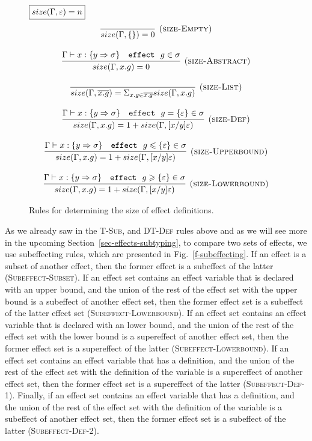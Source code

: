 \begin{figure}[t]
\flushleft
\footnotesize{
\noindent$\fbox{$size(\Gamma, \varepsilon) = n$}$
\[
\begin{array}{c}
\infer[\textsc{(size-Empty)}]
    {size(\Gamma, \{\}) = 0}
    {}\\[3ex]
\infer[\textsc{(size-Abstract)}]
    {size(\Gamma, x.g) = 0}
    {\Gamma \vdash x: \{y\Rightarrow \sigma\}\quad \keyw{effect}\ g\in \sigma}\\[3ex]
\infer[\textsc{(size-List)}]
    {size(\Gamma, \overline{x.g}) = \Sigma_{x.g\in \overline{x.g}}size(\Gamma, x.g)}
    {}\\[3ex]
\infer[\textsc{(size-Def)}]
    {size(\Gamma, x.g) = 1+size(\Gamma, [x/y]\varepsilon)}
    {\Gamma \vdash x : \{y\Rightarrow \sigma\}\quad \keyw{effect}\ g=\{\varepsilon\}\in\sigma}\\[3ex]
\infer[\textsc{(size-Upperbound)}]
    {size(\Gamma, x.g) = 1+size(\Gamma, [x/y]\varepsilon)}
    {\Gamma \vdash x : \{y\Rightarrow \sigma\}\quad \keyw{effect}\ g \leqslant \{\varepsilon\}\in\sigma}\\[3ex]
\infer[\textsc{(size-Lowerbound)}]
    {size(\Gamma, x.g) = 1+size(\Gamma, [x/y]\varepsilon)}
    {\Gamma \vdash x : \{y\Rightarrow \sigma\}\quad \keyw{effect}\ g \geqslant \{\varepsilon\}\in\sigma}%
\end{array}
\]
}
\caption{Rules for determining the size of effect definitions.}
\label{f-size}
\end{figure}


As we already saw in the \textsc{T-Sub}, and \textsc{DT-Def} rules above and as we will see more in the upcoming Section~\ref{sec-effects-subtyping}, to compare two sets of effects, we use subeffecting rules, which are presented in Fig.~\ref{f-subeffecting}. If an effect is a subset of another effect, then the former effect is a subeffect of the latter (\textsc{Subeffect-Subset}). If an effect set contains an effect variable that is declared with an upper bound, and the union of the rest of the effect set with the upper bound is a subeffect of another effect set, then the former effect set is a subeffect of the latter effect set (\textsc{Subeffect-Lowerbound}). If an effect set contains an effect variable that is declared with an lower bound, and the union of the rest of the effect set with the lower bound is a supereffect of another effect set, then the former effect set is a supereffect of the latter (\textsc{Subeffect-Lowerbound}). If an effect set contains an effect variable that has a definition, and the union of the rest of the effect set with the definition of the variable is a supereffect of another effect set, then the former effect set is a supereffect of the latter (\textsc{Subeffect-Def-1}). Finally, if an effect set contains an effect variable that has a definition, and the union of the rest of the effect set with the definition of the variable is a subeffect of another effect set, then the former effect set is a subeffect of the latter  (\textsc{Subeffect-Def-2}).

